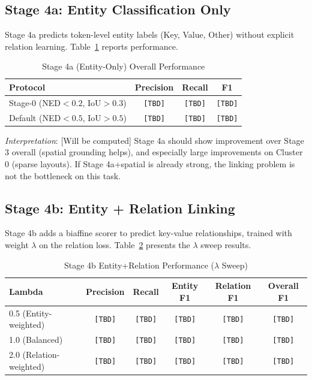 \subsection{Stage 4a: Entity Classification Only}
\label{sec:stage4a_results}

Stage 4a predicts token-level entity labels (Key, Value, Other) without explicit relation learning. Table~\ref{tab:stage4a_overall} reports performance.

\begin{table}[ht]
\centering
\caption{Stage 4a (Entity-Only) Overall Performance}
\label{tab:stage4a_overall}
\begin{tabular}{@{}lccc@{}}
\toprule
\textbf{Protocol} & \textbf{Precision} & \textbf{Recall} & \textbf{F1} \\
\midrule
Stage-0 (NED$<0.2$, IoU$>0.3$) & \texttt{[TBD]} & \texttt{[TBD]} & \texttt{[TBD]} \\
Default (NED$<0.5$, IoU$>0.5$) & \texttt{[TBD]} & \texttt{[TBD]} & \texttt{[TBD]} \\
\bottomrule
\end{tabular}
\end{table}

\textit{Interpretation}: [Will be computed] Stage 4a should show improvement over Stage 3 overall (spatial grounding helps), and especially large improvements on Cluster 0 (sparse layouts). If Stage 4a+spatial is already strong, the linking problem is not the bottleneck on this task.

\subsection{Stage 4b: Entity + Relation Linking}
\label{sec:stage4b_results}

Stage 4b adds a biaffine scorer to predict key-value relationships, trained with weight $\lambda$ on the relation loss. Table~\ref{tab:stage4b_lambda_sweep} presents the $\lambda$ sweep results.

\begin{table}[ht]
\centering
\caption{Stage 4b Entity+Relation Performance (\texorpdfstring{$\lambda$}{lambda} Sweep)}
\label{tab:stage4b_lambda_sweep}
\begin{tabular}{@{}lccccc@{}}
\toprule
\textbf{Lambda} & \textbf{Precision} & \textbf{Recall} & \textbf{Entity F1} & \textbf{Relation F1} & \textbf{Overall F1} \\
\midrule
0.5 (Entity-weighted) & \texttt{[TBD]} & \texttt{[TBD]} & \texttt{[TBD]} & \texttt{[TBD]} & \texttt{[TBD]} \\
1.0 (Balanced) & \texttt{[TBD]} & \texttt{[TBD]} & \texttt{[TBD]} & \texttt{[TBD]} & \texttt{[TBD]} \\
2.0 (Relation-weighted) & \texttt{[TBD]} & \texttt{[TBD]} & \texttt{[TBD]} & \texttt{[TBD]} & \texttt{[TBD]} \\
\bottomrule
\end{tabular}
\end{table}

